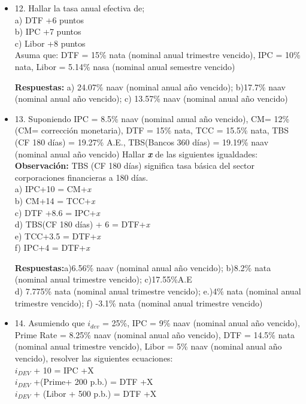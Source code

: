 \begin{itemize}
 \item 12. Hallar la tasa anual efectiva de;\\
       a) DTF +6 puntos\\
       b) IPC +7 puntos\\
       c) Libor +8 puntos\\
       Asuma que: DTF = 15\% nata (nominal anual trimestre vencido), IPC = 10\% nata, Libor = 5.14\% nasa (nominal anual semestre vencido)
       
       \textbf{Respuestas:} a) 24.07\% naav (nominal anual año vencido); b)17.7\% naav (nominal anual año vencido); c) 13.57\% naav (nominal anual año vencido)\\
       \medskip

 \item 13. Suponiendo IPC = 8.5\% naav (nominal anual año vencido), CM= 12\% (CM= corrección monetaria), DTF = 15\% nata, TCC = 15.5\% nata, TBS (CF 180 días) = 19.27\% A.E., TBS(Bancos 360 días) = 19.19\% naav (nominal anual año vencido) Hallar \textbf{\textit{x}} de las siguientes igualdades:\\
       \textbf{Observación:} TBS (CF 180 días) significa tasa básica del sector corporaciones financieras a 180 días.\\

       a) IPC+10 = CM+\textit{x}\\
       b) CM+14 = TCC+\textit{x}\\
       c) DTF +8.6 = IPC+\textit{x}\\
       d) TBS(CF 180 días) + 6 = DTF+\textit{x}\\
       e) TCC+3.5 = DTF+\textit{x}\\
       f) IPC+4 = DTF+\textit{x}
       
       \textbf{Respuestas:}a)6.56\% naav (nominal anual año vencido); b)8.2\% nata (nominal anual trimestre vencido); c)17.55\%A.E
       \\d) 7.775\% nata (nominal anual trimestre vencido); e.)4\% nata (nominal anual trimestre vencido); f) -3.1\% nata (nominal anual trimestre vencido)\\
       \medskip

 \item 14. Asumiendo que $i_{dev}$  = 25\%, IPC = 9\% naav (nominal anual año vencido), Prime Rate = 8.25\% naav (nominal anual año vencido), DTF = 14.5\% nata (nominal anual trimestre vencido), Libor = 5\% naav (nominal anual año vencido), resolver las siguientes ecuaciones:\\
       $i_{DEV}$  + 10 = IPC +X\\
       $i_{DEV}$  +(Prime+ 200 p.b.) = DTF +X\\
       $i_{DEV}$  + (Libor + 500 p.b.) = DTF +X
       

\end{itemize}
